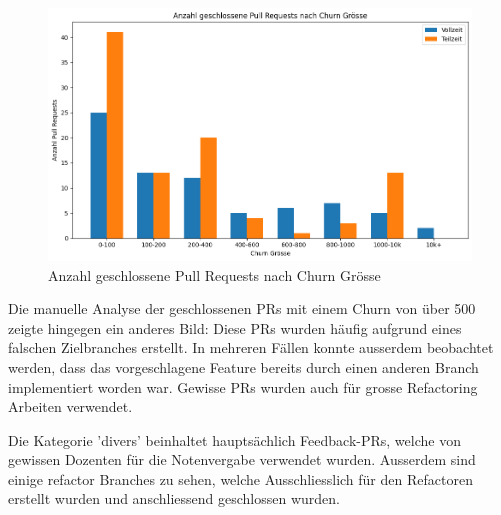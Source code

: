 \begin{figure}[htbp]
    \includegraphics[width=\textwidth]{Figures/anzahl-geschlossene-prs-nach-churn.png}
    \caption{Anzahl geschlossene Pull Requests nach Churn Grösse}
    \label{fig:anz-clsd-prs-nach-churn}
\end{figure}


Die manuelle Analyse der geschlossenen PRs mit einem Churn von über 500 zeigte hingegen ein anderes Bild: Diese PRs wurden häufig aufgrund eines falschen Zielbranches erstellt. In mehreren Fällen konnte ausserdem beobachtet werden, dass das vorgeschlagene Feature bereits durch einen anderen Branch implementiert worden war. Gewisse PRs wurden auch für grosse Refactoring Arbeiten verwendet. 

Die Kategorie 'divers' beinhaltet hauptsächlich Feedback-PRs, welche von gewissen Dozenten für die Notenvergabe verwendet wurden. Ausserdem sind einige refactor Branches zu sehen, welche Ausschliesslich für den Refactoren erstellt wurden und anschliessend geschlossen wurden. 

